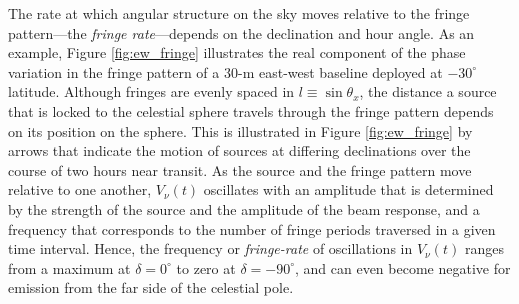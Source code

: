 \documentclass[twocolumn,apj,numberedappendix]{emulateapj}
\begin{document}
The rate at which angular structure on the sky moves relative to the fringe pattern---the \emph{fringe rate}---depends on the declination and hour angle. 
%
%
As an example, Figure \ref{fig:ew_fringe} illustrates the real component of the phase
variation in the fringe pattern of a 30-m east-west baseline deployed at $-30^\circ$ latitude.
Although fringes are evenly spaced in $l\equiv\sin\theta_x$, the distance a source that is locked to the celestial
sphere travels through the fringe pattern depends on its position on the sphere. This is illustrated in Figure
\ref{fig:ew_fringe} by arrows that indicate the motion of sources at differing declinations over the course
of two hours near transit.  As the source and the fringe pattern move relative to one another,  $V_\nu(t)$ oscillates
with an amplitude that is determined by the strength of the source and the amplitude of the beam response,
and a frequency that corresponds to the number of fringe periods traversed in a given time interval.  Hence, the frequency or {\it fringe-rate} of oscillations in $V_\nu(t)$
ranges from a maximum at $\delta=0^\circ$ to zero at $\delta=-90^\circ$, and can even become negative
for emission from the far side of the celestial pole.
\end{document}
